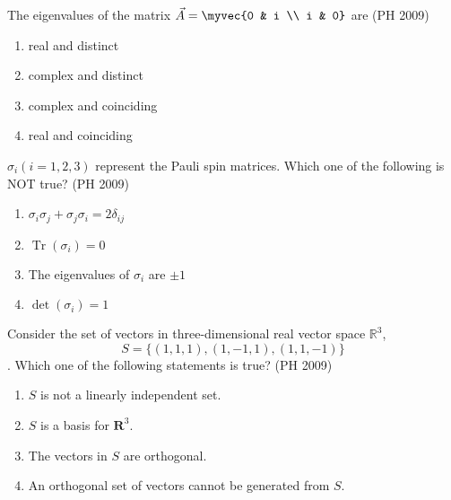\item The eigenvalues of the matrix $\vec{A} = \myvec{0 & i \\ i & 0}$ are
    \hfill {(PH 2009)}
    \begin{multicols}{2}
    \begin{enumerate}
        \item real and distinct
        \item complex and distinct
        \item complex and coinciding
        \item real and coinciding
    \end{enumerate}
    \end{multicols}
\item $\sigma_i (i=1, 2, 3)$ represent the Pauli spin matrices. Which one of the following is {NOT} true?
    \hfill {(PH 2009)}
    \begin{multicols}{2}
    \begin{enumerate}
        \item $\sigma_i \sigma_j + \sigma_j \sigma_i = 2\delta_{ij}$
        \item $\operatorname{Tr}(\sigma_i) = 0$
        \item The eigenvalues of $\sigma_i$ are $\pm 1$
        \item $\det(\sigma_i) = 1$
    \end{enumerate}
    \end{multicols}
\item Consider the set of vectors in three-dimensional real vector space $\mathbb{R}^3$, $$S = \{(1,1,1), (1,-1,1), (1,1,-1)\}$$. Which one of the following statements is true?
\hfill {(PH 2009)}
\begin{enumerate}
\item $S$ is not a linearly independent set.
\item $S$ is a basis for $\mathbf{R}^3$.
\item The vectors in $S$ are orthogonal.
\item An orthogonal set of vectors cannot be generated from $S$.
\end{enumerate}

